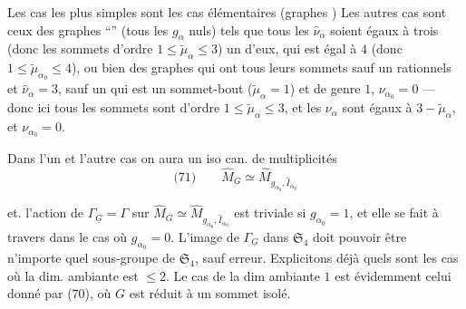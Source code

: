 Les cas les plus simples sont les cas élémentaires (graphes  )
Les autres cas sont ceux des graphes ``\uline{}'' (tous les $g_\alpha$ nuls) tels que tous les $\widehat\nu_\alpha$ soient égaux à trois (donc les sommets d'ordre $1\leq\widetilde\mu_\alpha\leq3$)  un d'eux, qui est égal à $4$ (donc $1\leq\widetilde\mu_{\alpha_0}\leq4$), ou bien des graphes qui ont tous leurs sommets sauf un rationnels et $\widehat\nu_\alpha=3$,  sauf un  qui est un sommet-bout ($\widetilde\mu_\alpha=1$) et de genre $1$, $\nu_{\alpha_0}=0$ --- donc ici tous les sommets sont d'ordre $1\leq\widetilde\mu_\alpha\leq3$, et les $\nu_\alpha$  sont égaux à $3-\widetilde\mu_\alpha$,  et $\nu_{\alpha_0}=0$.

Dans l'un et l'autre cas  on aura un iso can. de multiplicités
\[
\text{(71)}\qquad\widehat M_G\simeq\widehat M_{g_{\alpha_0},\widehat I_{\alpha_0}}
\]

 et. l'action de $\Gamma_{\underline G}=\Gamma$ sur $\widehat M_G\simeq\widehat M_{g_{\alpha_0},\widehat I_{\alpha_0}}$ est triviale si $g_{\alpha_0}=1$, et elle se fait à travers
dans le cas où $g_{\alpha_0}=0$. L'image de $\Gamma_{\underline G}$ dans $\mathfrak S_4$ doit pouvoir être n'importe quel sous-groupe de $\mathfrak S_4$, sauf erreur. Explicitons déjà quels sont les cas où la dim. ambiante est $\leq2$. Le cas de la dim ambiante $1$  est évidemment celui donné par (70), où $G$ est réduit à un sommet isolé.

